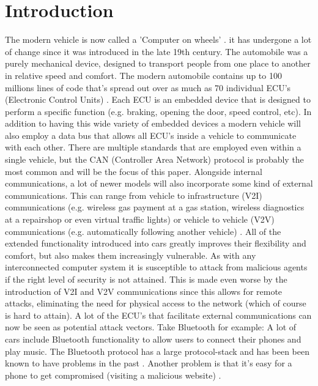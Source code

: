 \documentclass[11pt]{article}
\begin{document}
\section{Introduction}
The modern vehicle is now called a 'Computer on wheels' \cite{Klinedinst05} . it has undergone a lot of change since it was introduced in the late 19th century. The automobile was a purely mechanical device, designed to transport people from one place to another in relative speed and comfort. The modern automobile contains up to 100 millions lines of code that's spread out over as much as 70 individual ECU's (Electronic Control Units) \cite{Pike15}. Each ECU is an embedded device that is designed to perform a specific function (e.g. braking, opening the door, speed control, etc). In addition to having this wide variety of embedded devices a modern vehicle will also employ a data bus that allows all ECU's inside a vehicle to communicate with each other. There are multiple standards that are employed even within a single vehicle, but the CAN (Controller Area Network) protocol is probably the most common and will be the focus of this paper. Alongside internal communications, a lot of newer models will also incorporate some kind of external communications. This can range from vehicle to infrastructure (V2I) communications (e.g. wireless gas payment at a gas station, wireless diagnostics at a repairshop or even virtual traffic lights) or vehicle to vehicle (V2V) communications (e.g. automatically following another vehicle) \cite{Kleberger15} \cite{Russel17}.\newline
\newline
All of the extended functionality introduced into cars greatly improves their flexibility and comfort, but also makes them increasingly vulnerable. As with any interconnected computer system it is susceptible to attack from malicious agents if the right level of security \cite{Enisa} is not attained. This is made even worse by the introduction of V2I and V2V communications since this allows for remote attacks, eliminating the need for physical access to the network (which of course is hard to attain). A lot of the ECU's that facilitate external communications can now be seen as potential attack vectors. Take Bluetooth for example: A lot of cars include Bluetooth functionality to allow users to connect their phones and play music. The Bluetooth protocol has a large protocol-stack and has been been known to have problems in the past \cite{MillerA}. Another problem is that it's easy for a phone to get compromised (visiting a malicious website) \cite{Yadav16}. \newline
\newline
\end{document}
